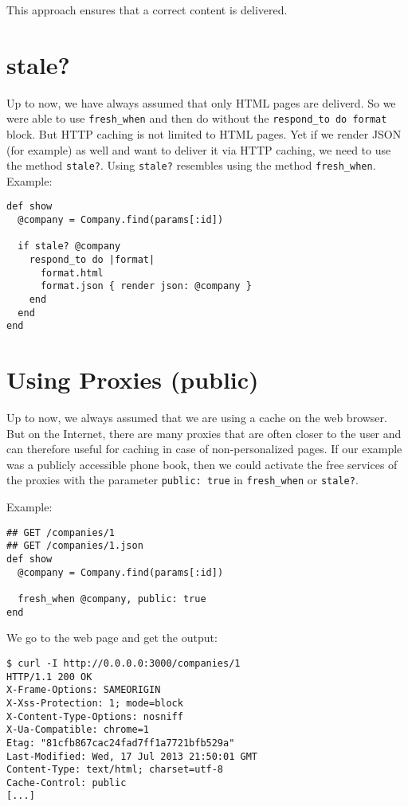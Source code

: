 \documentclass[a4paper]{book}
\begin{document}
This approach ensures that a correct content is delivered.

\section{stale?}\label{stale}

Up to now, we have always assumed that only HTML pages are deliverd. So we were able to use \texttt{fresh\_when} and then do without the \texttt{respond\_to do \textbar{}format\textbar{}} block. But HTTP caching is not limited to HTML pages. Yet if we render JSON (for example) as well and want to deliver it via HTTP caching, we need to use the method \texttt{stale?}. Using \texttt{stale?} resembles using the method \texttt{fresh\_when}. Example:

\begin{shaded}\begin{verbatim}
def show
  @company = Company.find(params[:id])

  if stale? @company
    respond_to do |format|
      format.html
      format.json { render json: @company }
    end
  end
end
\end{verbatim}\end{shaded}

\section{Using Proxies (public)}\label{using-proxies-public}

Up to now, we always assumed that we are using a cache on the web browser. But on the Internet, there are many proxies that are often closer to the user and can therefore useful for caching in case of non-personalized pages. If our example was a publicly accessible phone book, then we could activate the free services of the proxies with the parameter \texttt{public: true} in \texttt{fresh\_when} or \texttt{stale?}.

Example:

\begin{shaded}\begin{verbatim}
## GET /companies/1
## GET /companies/1.json
def show
  @company = Company.find(params[:id])

  fresh_when @company, public: true
end
\end{verbatim}\end{shaded}

We go to the web page and get the output:

\begin{shaded}\begin{verbatim}
$ curl -I http://0.0.0.0:3000/companies/1
HTTP/1.1 200 OK
X-Frame-Options: SAMEORIGIN
X-Xss-Protection: 1; mode=block
X-Content-Type-Options: nosniff
X-Ua-Compatible: chrome=1
Etag: "81cfb867cac24fad7ff1a7721bfb529a"
Last-Modified: Wed, 17 Jul 2013 21:50:01 GMT
Content-Type: text/html; charset=utf-8
Cache-Control: public
[...]
\end{verbatim}\end{shaded}
\end{document}
